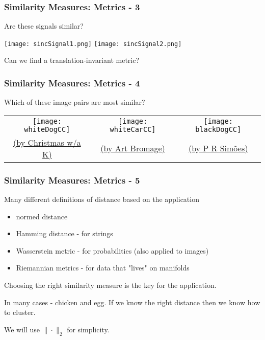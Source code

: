 \documentclass[12pt,handout]{beamer}
\begin{document}
\begin{frame}
\frametitle{Similarity Measures: Metrics - 3}

Are these signals similar?

\begin{center}
\texttt{[image: sincSignal1.png]}
\texttt{[image: sincSignal2.png]}
\end{center}

Can we find a translation-invariant metric?

\end{frame}

\begin{frame}
\frametitle{Similarity Measures: Metrics - 4}

Which of these image pairs are most similar?

\begin{center}
	\begin{tabular}{@{}c@{ }c@{ }c@{}}
		\texttt{[image: whiteDogCC]} &
		\texttt{[image: whiteCarCC]}& 
		\texttt{[image: blackDogCC]}\\
		\scriptsize \href{https://commons.wikimedia.org/w/index.php?curid=20509768}{(by Christmas w/a K)} &
		\scriptsize \href{https://commons.wikimedia.org/w/index.php?curid=12225485}{(by Art Bromage)} &
		\scriptsize \href{https://commons.wikimedia.org/w/index.php?curid=38049555}{(by  P R Simões)} 
 	\end{tabular}

\end{center}

\end{frame}

\begin{frame}
\frametitle{Similarity Measures: Metrics - 5}

Many different definitions of distance based on the application
\begin{itemize}
\item normed distance
\item Hamming distance - for strings
\item Wasserstein metric - for probabilities (also applied to images)
\item Riemannian metrics - for data that "lives" on manifolds
\end{itemize}

\bigskip

Choosing the right similarity measure is the key for the application.

In many cases - chicken and egg. If we know the right distance then we know how to cluster.

\bigskip

We will use $\|\cdot\|_2$ for simplicity.

\end{frame}
\end{document}

